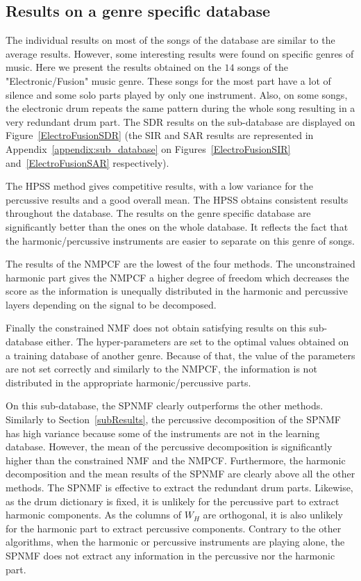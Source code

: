 \subsection{Results on a genre specific database}
\label{sec:subdata}

The individual results on most of the songs of the database are similar to the average results. However, some interesting results were found on specific genres of music. Here we present the results obtained on the $14$ songs of the "Electronic/Fusion" music genre. These songs for the most part have a lot of silence and some solo parts played by only one instrument. Also, on some songs, the electronic drum repeats the same pattern during the whole song resulting in a very redundant drum part. The SDR results on the sub-database are displayed on Figure~\ref{ElectroFusionSDR} (the SIR and SAR results are represented in Appendix~\ref{appendix:sub_database} on Figures~\ref{ElectroFusionSIR} and~\ref{ElectroFusionSAR} respectively). 

The HPSS method gives competitive results, with a low variance for the percussive results and a good overall mean. The HPSS obtains consistent results throughout the database. The results on the genre specific database are significantly better than the ones on the whole database. It reflects the fact that the harmonic/percussive instruments are easier to separate on this genre of songs. 
 
The results of the NMPCF are the lowest of the four methods. The unconstrained harmonic part gives the NMPCF a higher degree of freedom which decreases the score as the information is unequally distributed in the harmonic and percussive layers depending on the signal to be decomposed. 

Finally the constrained NMF does not obtain satisfying results on this sub-database either. The hyper-parameters are set to the optimal values obtained on a training database of another genre. Because of that, the value of the parameters are not set correctly and similarly to the NMPCF, the information is not distributed in the appropriate harmonic/percussive parts. 


On this sub-database, the SPNMF clearly outperforms the other methods. Similarly to Section~\ref{subResults}, the percussive decomposition of the SPNMF has high variance because some of the instruments are not in the learning database. However, the mean of the percussive decomposition is significantly higher than the constrained NMF and the NMPCF. Furthermore, the harmonic decomposition and the mean results of the SPNMF are clearly above all the other methods. The SPNMF is effective to extract the redundant drum parts. Likewise, as the drum dictionary is fixed, it is unlikely for the percussive part to extract harmonic components. As the columns of $W_{H}$ are orthogonal, it is also unlikely for the harmonic part to extract percussive components. Contrary to the other algorithms, when the harmonic or percussive instruments are playing alone, the SPNMF does not extract any information in the percussive nor the harmonic part.




